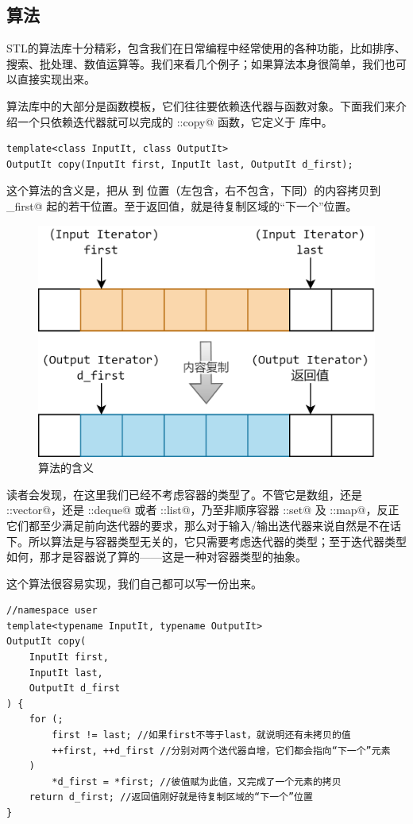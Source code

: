 \subsection*{算法}
STL的算法库十分精彩，包含我们在日常编程中经常使用的各种功能，比如排序、搜索、批处理、数值运算等。我们来看几个例子；如果算法本身很简单，我们也可以直接实现出来。\par
算法库中的大部分是函数模板，它们往往要依赖迭代器与函数对象。下面我们来介绍一个只依赖迭代器就可以完成的 \lstinline@std::copy@ 函数，它定义于 \lstinline@algorithm@ 库中。
\begin{lstlisting}
template<class InputIt, class OutputIt>
OutputIt copy(InputIt first, InputIt last, OutputIt d_first);
\end{lstlisting}
这个算法的含义是，把从 \lstinline@first@ 到 \lstinline@last@ 位置（左包含，右不包含，下同）的内容拷贝到 \lstinline@d_first@ 起的若干位置。至于返回值，就是待复制区域的``下一个''位置。\par
\begin{figure}[htbp]
    \centering
    \includegraphics[width=.6\textwidth]{../images/generalized_parts/11_algorithm_copy.drawio.png}
    \caption{\lstinline@copy@ 算法的含义}
\end{figure}
读者会发现，在这里我们已经不考虑容器的类型了。不管它是数组，还是 \lstinline@std::vector@，还是 \lstinline@std::deque@ 或者 \lstinline@std::list@，乃至非顺序容器 \lstinline@std::set@ 及 \lstinline@std::map@，反正它们都至少满足前向迭代器的要求，那么对于输入/输出迭代器来说自然是不在话下。所以算法是与容器类型无关的，它只需要考虑迭代器的类型；至于迭代器类型如何，那才是容器说了算的——这是一种对容器类型的抽象。\par
这个算法很容易实现，我们自己都可以写一份出来。
\begin{lstlisting}
//namespace user
template<typename InputIt, typename OutputIt>
OutputIt copy(
    InputIt first,
    InputIt last,
    OutputIt d_first
) {
    for (; 
        first != last; //如果first不等于last，就说明还有未拷贝的值
        ++first, ++d_first //分别对两个迭代器自增，它们都会指向“下一个”元素
    )
        *d_first = *first; //彼值赋为此值，又完成了一个元素的拷贝
    return d_first; //返回值刚好就是待复制区域的“下一个”位置
}
\end{lstlisting}
